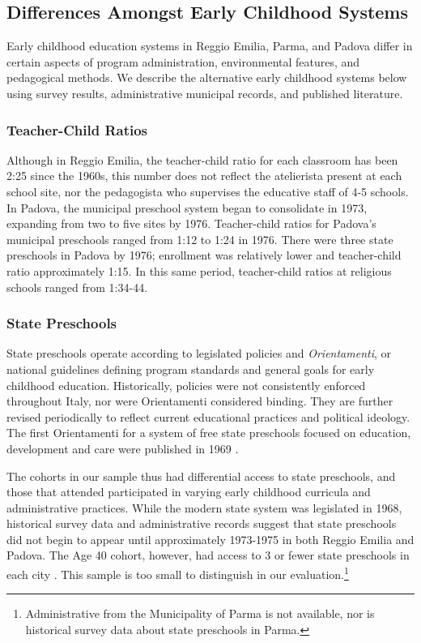 \subsection{Differences Amongst Early Childhood Systems}

Early childhood education systems in Reggio Emilia, Parma, and Padova differ in certain aspects of program administration, environmental features, and pedagogical methods. We describe the alternative early childhood systems below using survey results, administrative municipal records, and published literature.

\subsubsection{Teacher-Child Ratios}

Although in Reggio Emilia, the teacher-child ratio for each classroom has been 2:25 since the 1960s, this number does not reflect the atelierista present at each school site, nor the pedagogista who supervises the educative staff of 4-5 schools. In Padova, the municipal preschool system began to consolidate in 1973, expanding from two to five sites by 1976. Teacher-child ratios for Padova's municipal preschools ranged from 1:12 to 1:24 in 1976. There were three state preschools in Padova by 1976; enrollment was relatively lower and teacher-child ratio approximately 1:15. In this same period, teacher-child ratios at religious schools ranged from 1:34-44.

\subsubsection{State Preschools}

State preschools operate according to legislated policies and \textit{Orientamenti}, or national guidelines defining program standards and general goals for early childhood education. Historically, policies were not consistently enforced throughout Italy, nor were Orientamenti considered binding. They are further revised periodically to reflect current educational practices and political ideology. The first Orientamenti for a system of free state preschools focused on education, development and care were published in 1969 \citep{Corsaro_1996_Early-Edu,Hohnerlein_2015_Development-and-DiffusionEnrollment}.

The cohorts in our sample thus had differential access to state preschools, and those that attended participated in varying early childhood curricula and administrative practices. While the modern state system was legislated in 1968, historical survey data and administrative records suggest that state preschools did not begin to appear until approximately 1973-1975 in both Reggio Emilia and Padova. The Age 40 cohort, however, had access to 3 or fewer state preschools in each city \citep{Reggio-Admin-data_1966-2006, Reggio-Annual-Journals_1994-2011, Padova-Admin-Data_1964-2011}. This sample is too small to distinguish in our evaluation.\footnote{Administrative from the Municipality of Parma is not available, nor is historical survey data about state preschools in Parma.} 

